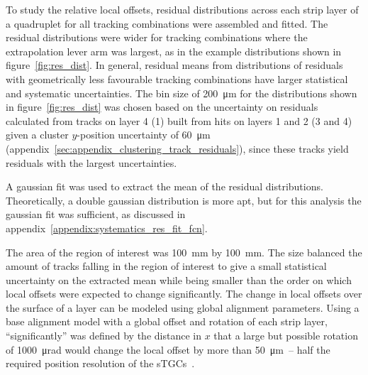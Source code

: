 To study the relative local offsets, residual distributions across each strip layer of a quadruplet for all tracking combinations were assembled and fitted. The residual distributions were wider for tracking combinations where the extrapolation lever arm was largest, as in the example distributions shown in figure~\ref{fig:res_dist}. In general, residual means from distributions of residuals with geometrically less favourable tracking combinations have larger statistical and systematic uncertainties. The bin size of \SI{200}{\micro\meter} for the distributions shown in figure~\ref{fig:res_dist} was chosen based on the uncertainty on residuals calculated from tracks on layer 4 (1) built from hits on layers 1 and 2 (3 and 4) given a cluster $y$-position uncertainty of \SI{60}{\micro\meter} (appendix~\ref{sec:appendix_clustering_track_residuals}), since these tracks yield residuals with the largest uncertainties.

A gaussian fit was used to extract the mean of the residual distributions. Theoretically, a double gaussian distribution is more apt, but for this analysis the gaussian fit was sufficient, as discussed in appendix~\ref{appendix:systematics_res_fit_fcn}.

The area of the region of interest was \SI{100}{\milli\meter} by \SI{100}{\milli\meter}. The size balanced the amount of tracks falling in the region of interest to give a small statistical uncertainty on the extracted mean while being smaller than the order on which local offsets were expected to change significantly. The change in local offsets over the surface of a layer can be modeled using global alignment parameters. Using a base alignment model with a global offset and rotation of each strip layer, ``significantly'' was defined by the distance in $x$ that a large but possible rotation of \SI{1000}{\micro\radian} would change the local offset by more than \SI{50}{\micro\meter}~-- half the required position resolution of the sTGCs~\cite{nsw_tdr}.


